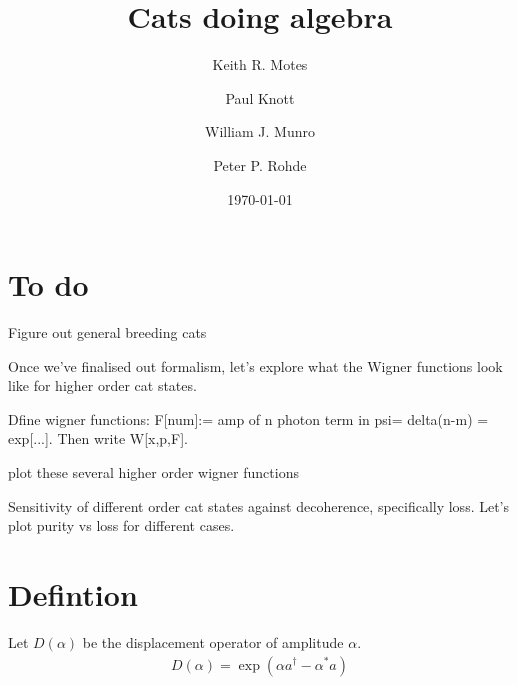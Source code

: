 \documentclass[aps,prl,twocolumn,amsmath,amssymb,nofootinbib,superscriptaddress]{revtex4}
\begin{document}


\title{Cats doing algebra}
 
\author{Keith R. Motes}

\author{Paul Knott}

\author{William J. Munro}

\author{Peter P. Rohde}

\date{\today}

\frenchspacing

\begin{abstract}
\end{abstract}

\maketitle

\section{To do}

Figure out general breeding cats

Once we've finalised out formalism, let's explore what the Wigner functions look like for higher order cat states.

Dfine wigner functions: F[num]:= amp of n photon term in psi= delta(n-m) = exp[...]. Then write W[x,p,F].

plot these several higher order wigner functions

Sensitivity of different order cat states against decoherence, specifically loss. Let's plot purity vs loss for different cases.

\section{Defintion}

Let $D(\alpha)$ be the displacement operator of amplitude $\alpha$.
\begin{eqnarray}
D(\alpha) = \exp(\alpha a^\dag - \alpha^* a)
\end{eqnarray}
\end{document}
